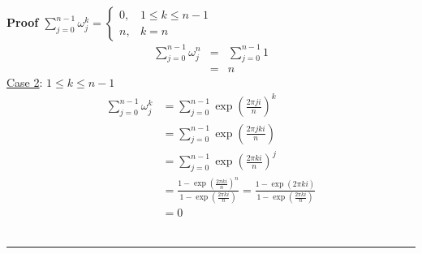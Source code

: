 \documentclass{article}%
\newcommand\EXP[1]{\exp\left(#1\right)}
\newenvironment{proof}[1][]{\begin{samepage}\textbf{Proof #1} \\ }{\\ \rule{0.5em}{0.5em} \end{samepage} \\}
\begin{document}
\begin{enumerate}
\begin{enumerate}[label=\alph*]
\begin{proof}[$\sum\limits_{j=0}^{n-1}{\omega_j^k}=\left\{ \begin{array} {lr} 0, & 1 \leq k \leq n-1 \\ n, & k=n \end{array} \right. $]
\begin{eqnarray*}
                \sum\limits_{j=0}^{n-1}{\omega_j^n} &=& \sum\limits_{j=0}^{n-1}{1} \\
                                                    &=& n
            \end{eqnarray*}
            \underline{Case 2}: $1 \leq k \leq n-1$
            \begin{align*}
                \sum\limits_{j=0}^{n-1}{\omega_j^k} &= \sum\limits_{j=0}^{n-1}{\EXP{\frac{2 \pi j i}{n}}^k} \\
                                                    &= \sum\limits_{j=0}^{n-1}{\EXP{\frac{2 \pi j k i}{n}}} \\
                                                    &= \sum\limits_{j=0}^{n-1}{\EXP{\frac{2 \pi k i}{n}}^j} \\
                                                    &= \frac{1-\EXP{\frac{2 \pi k i}{n}}^n}{1-\EXP{\frac{2\pi ki}{n}}}=\frac{1-\EXP{2\pi ki}}{1-\EXP{\frac{2 \pi k i}{n}}} \\
                                                    &= 0
            \end{align*}
        \end{proof}
    \end{enumerate}
\end{enumerate}
\end{document}
